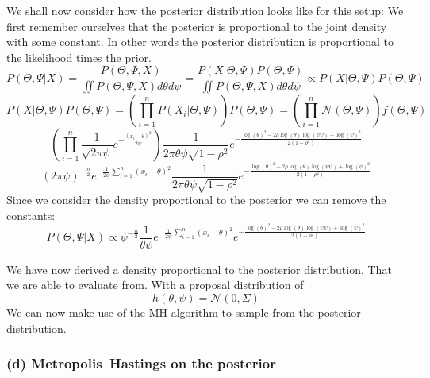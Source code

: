 We shall now consider how the posterior distribution looks like for this setup: 
We first remember ourselves that the posterior is proportional to the joint density with some constant. In other words the posterior distribution is proportional to the likelihood times the prior. 
\begin{equation}
    P(\Theta, \Psi | X) = \frac{P(\Theta, \Psi, X)}{\iint P(\Theta, \Psi, X) d\theta d\psi} =
    \frac{P(X|\Theta, \Psi) P(\Theta, \Psi)}{\iint P(\Theta, \Psi, X) d \theta d \psi} \propto P(X|\Theta, \Psi) P(\Theta, \Psi) 
\end{equation}
\begin{equation}
     P(X|\Theta, \Psi) P(\Theta, \Psi) = \left( \prod_{i=1}^n  P(X_i|\Theta, \Psi) \right) P(\Theta, \Psi) = \left( \prod_{i=1}^n \mathcal{N}(\Theta, \Psi) \right) f(\Theta, \Psi)
\end{equation}
\begin{equation}
    \left(\prod_{i=1}^n \frac{1}{\sqrt{2 \pi \psi}}  e^{- \frac{(x_i -\theta)^2}{2 \psi}} \right) \frac{1}{2 \pi \theta \psi \sqrt{1-\rho^2}} e^{ -\frac{\log (\theta)^2-2 \rho \log (\theta) \log (\psi\psi)+\log (\psi)^2}{2\left(1-\rho^2\right)}}
\end{equation}
\begin{equation}
    (2 \pi \psi)^{- \frac{n}{2}}  e^{-\frac{1}{2 \psi} \sum_{i=1}^n (x_i -\theta)^2} \frac{1}{2 \pi \theta \psi \sqrt{1-\rho^2}} e^{ -\frac{\log (\theta)^2-2 \rho \log (\theta) \log (\psi\psi)+\log (\psi)^2}{2\left(1-\rho^2\right)}}
\end{equation}
Since we consider the density proportional to the posterior we can remove the constants: 
\begin{equation}
    P(\Theta, \Psi | X) \propto \psi^{- \frac{n}{2}} \frac{1}{\theta \psi} e^{-\frac{1}{2 \psi} \sum_{i=1}^n (x_i -\theta)^2} e^{ -\frac{\log (\theta)^2-2 \rho \log (\theta) \log (\psi\psi)+\log (\psi)^2}{2\left(1-\rho^2\right)}}
\end{equation}

We have now derived a density proportional to the posterior distribution. That we are able to evaluate from. With a proposal distribution of 
\begin{equation}
    h(\theta, \psi) = \mathcal{N}(0, \Sigma)
\end{equation}
We can now make use of the MH algorithm to sample from the posterior distribution. 

\subsubsection*{(d) Metropolis--Hastings on the posterior}


